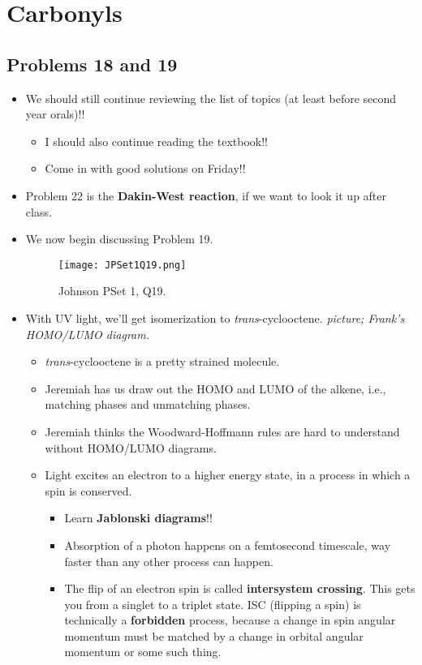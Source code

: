 \documentclass[../notes.tex]{subfiles}
\begin{document}
\chapter{Carbonyls}
\section{Problems 18 and 19}
\begin{itemize}
    \item {}We should still continue reviewing the list of topics (at least before second year orals)!!
    \begin{itemize}
        \item I should also continue reading the textbook!!
        \item Come in with good solutions on Friday!!
    \end{itemize}
    \item Problem 22 is the \textbf{Dakin-West reaction}, if we want to look it up after class.
    \item We now begin discussing Problem 19.
    \begin{figure}[h!]
        \centering
        \texttt{[image: JPSet1Q19.png]}
        \caption{Johnson PSet 1, Q19.}
        \label{fig:JPSet1Q19}
    \end{figure}
    \item With UV light, we'll get isomerization to \emph{trans}-cyclooctene.
    \emph{picture; Frank's HOMO/LUMO diagram.}
    \begin{itemize}
        \item \emph{trans}-cyclooctene is a pretty strained molecule.
        \item Jeremiah has us draw out the HOMO and LUMO of the alkene, i.e., matching phases and unmatching phases.
        \item Jeremiah thinks the Woodward-Hoffmann rules are hard to understand without HOMO/LUMO diagrams.
        \item Light excites an electron to a higher energy state, in a process in which a spin is conserved.
        \begin{itemize}
            \item Learn \textbf{Jablonski diagrams}!!
            \item Absorption of a photon happens on a femtosecond timescale, way faster than any other process can happen.
            \item The flip of an electron spin is called \textbf{intersystem crossing}. This gets you from a singlet to a triplet state. ISC (flipping a spin) is technically a \textbf{forbidden} process, because a change in spin angular momentum must be matched by a change in orbital angular momentum or some such thing.

\end{itemize}
\end{itemize}
\end{itemize}
\end{document}
